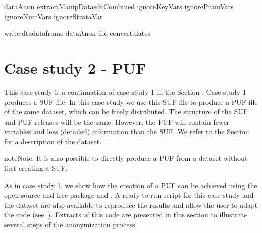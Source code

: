 \documentclass[letterpaper,10pt,english]{sphinxmanual}
\begin{document}
\def\sphinxLiteralBlockLabel{\label{\detokenize{case_studies:code926}}}
%
\begin{sphinxVerbatim}[commandchars=\\\{\},numbers=left,firstnumber=1,stepnumber=1]
dataAnon  extractManipDatasdcCombined ignoreKeyVars   ignorePramVars  
                             ignoreNumVars   ignoreStrataVar  

write.dtadataframe  dataAnon file  convert.dates
\end{sphinxVerbatim}


\section{Case study 2 - PUF}
\label{\detokenize{case_studies:case-study-2-puf}}
This case study is a continuation of case study 1 in the Section
{\hyperref[\detokenize{case_studies:case-study-1-suf}]{}} . Case
study 1 produces a SUF file. In this case study we use this SUF file to
produce a PUF file of the same dataset, which can be freely distributed.
The structure of the SUF and PUF releases will be the same. However, the
PUF will contain fewer variables and less (detailed) information than
the SUF. We refer to the Section {\hyperref[\detokenize{case_studies:case-study-1-suf}]{}}
for a description of the dataset.

\begin{sphinxadmonition}{note}{Note:}
It is also possible to directly produce a PUF from a dataset
without first creating a SUF.
\end{sphinxadmonition}

As in case study 1, we show how the creation of a PUF can be achieved
using the open source and free  package and . A
ready-to-run  script for this case study and the dataset are also
available to reproduce the results and allow the user to adapt the code
(see ). Extracts of this code
are presented in this section to illustrate several steps of the
anonymization process.
\end{document}
